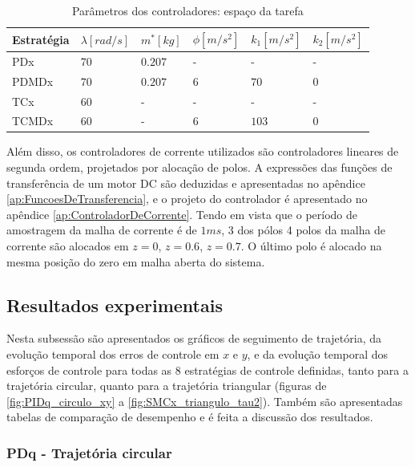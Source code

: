 \documentclass[]{politex}
\begin{document}
\begin{table}[H] 
\centering
\caption{Parâmetros dos controladores: espaço da tarefa}
\label{tab:parametrosControleEfetuador}
\begin{tabular}{l|l|l|l|l|l}
Estratégia & $\lambda [rad/s]$  & $m^*[kg]$ & $\phi[m/s^2]$ & $k_1[m/s^2]$ & $k_2[m/s^2]$ \\ \hline
PDx        & $70$               & $0.207$   & -             & -            & -            \\
PDMDx      & $70$               & $0.207$   & $6$           & $70$         & $0$          \\
TCx        & $60$               & -         & -             & -            & -            \\
TCMDx      & $60$               & -         & $6$           & $103$        & $0$          \\
\end{tabular}
\end{table}

Além disso, os controladores de corrente utilizados são controladores lineares de segunda ordem, projetados por alocação de polos. A expressões das funções de transferência de um motor DC são deduzidas e apresentadas no apêndice \ref{ap:FuncoesDeTransferencia}, e o projeto do controlador é apresentado no apêndice \ref{ap:ControladorDeCorrente}. Tendo em vista que o período de amostragem da malha de corrente é de $1ms$, 3 dos pólos 4 polos da malha de corrente são alocados em $z=0$, $z=0.6$, $z=0.7$. O último polo é alocado na mesma posição do zero em malha aberta do sistema.

\subsection{Resultados experimentais}

Nesta subsessão são apresentados os gráficos de seguimento de trajetória, da evolução temporal dos erros de controle em $x$ e $y$, e da evolução temporal dos esforços de controle para todas as 8 estratégias de controle definidas, tanto para a trajetória circular, quanto para a trajetória triangular (figuras de \ref{fig:PIDq_circulo_xy} a \ref{fig:SMCx_triangulo_tau2}). Também são apresentadas tabelas de comparação de desempenho e é feita a discussão dos resultados.

\newpage

\subsubsection{PDq - Trajetória circular}
\end{document}

